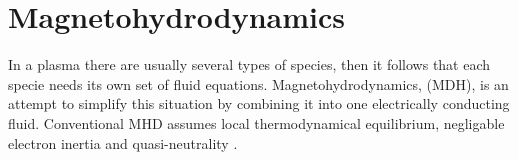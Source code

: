 \section{Magnetohydrodynamics}
    In a plasma there are usually several types of species, then it follows that
    each specie needs its own set of fluid equations. Magnetohydrodynamics, (MDH),
    is an attempt to simplify this situation by combining it into one electrically
    conducting fluid. Conventional MHD assumes local thermodynamical equilibrium,
    negligable electron inertia and quasi-neutrality \citep{goldston_introduction_1995}.
